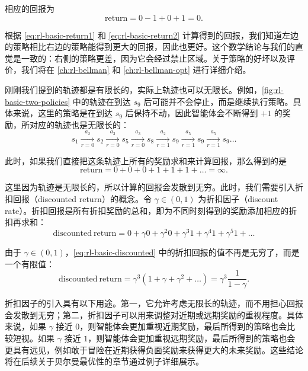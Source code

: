 相应的回报为
\begin{equation}
  \mathrm{return} = 0 - 1 + 0 + 1 = 0. \label{eq:rl-basic-return2}
\end{equation}

根据 \cref{eq:rl-basic-return1} 和 \cref{eq:rl-basic-return2} 计算得到的回报，我们知道左边的策略相比右边的策略能得到更大的回报，因此也更好。这个数学结论与我们的直觉是一致的：右侧的策略更差，因为它会经过禁止区域。关于策略的好坏以及评价，我们将在 \cref{ch:rl-bellman} 和 \cref{ch:rl-bellman-opt} 进行详细介绍。

刚刚我们提到的轨迹都是有限长的，实际上轨迹也可以无限长。例如，\cref{fig:rl-basic-two-policies} 中的轨迹在到达 $s_9$ 后可能并不会停止，而是继续执行策略。具体来说，这里的策略是在到达 $s_9$ 后保持不动，因此智能体会不断得到 $+1$ 的奖励，所对应的轨迹也是无限长的：
\begin{equation}
  s_1 \xrightarrow[r=0]{a_2} s_2 \xrightarrow[r=0]{a_3} s_5 \xrightarrow[r=0]{a_3} s_8 \xrightarrow[r=1]{a_2} s_9 \xrightarrow[r=1]{a_5} s_9 \xrightarrow[r=1]{a_5} s_9 \dots
\end{equation}

此时，如果我们直接把这条轨迹上所有的奖励求和来计算回报，那么得到的是
\begin{equation}
  \mathrm{return} = 0 + 0 + 0 + 1 + 1 + 1 + \dots = \infty.
\end{equation}

这里因为轨迹是无限长的，所以计算的回报会发散到无穷。此时，我们需要引入折扣回报（discounted return）的概念。令 $\gamma \in (0,1)$ 为折扣因子（discount rate）。折扣回报是所有折扣奖励的总和，即为不同时刻得到的奖励添加相应的折扣再求和：
\begin{equation}
  \mathrm{discounted\ return} = 0 + \gamma 0 + \gamma^2 0 + \gamma^3 1 + \gamma^4 1 + \gamma^5 1 + \dots \label{eq:rl-basic-discounted}
\end{equation}

由于 $\gamma \in (0,1)$，\cref{eq:rl-basic-discounted} 中的折扣回报的值不再是无穷了，而是一个有限值：
\begin{equation}
  \mathrm{discounted\ return} = \gamma^3 (1 + \gamma + \gamma^2 + \dots) = \gamma^3 \frac{1}{1 - \gamma}.
\end{equation}

折扣因子的引入具有以下用途。第一，它允许考虑无限长的轨迹，而不用担心回报会发散到无穷；第二，折扣因子可以用来调整对近期或远期奖励的重视程度。具体来说，如果 $\gamma$ 接近 $0$，则智能体会更加重视近期奖励，最后所得到的策略也会比较短视。如果 $\gamma$ 接近 $1$，则智能体会更加重视远期奖励，最后所得到的策略也会更具有远见，例如敢于冒险在近期获得负面奖励来获得更大的未来奖励。这些结论将在后续关于贝尔曼最优性的章节通过例子详细展示。

